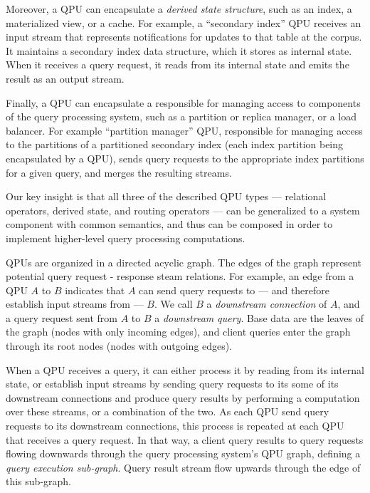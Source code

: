 Moreover, a QPU can encapsulate a \textit{derived state structure}, such as an index, a materialized view, or a cache.
For example, a ``secondary index'' QPU receives an input stream that represents notifications for updates to that table
at the corpus.
It maintains a secondary index data structure, which it stores as internal state.
When it receives a query request, it reads from its internal state and emits the result as an output stream.

Finally, a QPU can encapsulate a responsible for managing access to components of the query processing system, such as
a partition or replica manager, or a load balancer.
For example ``partition manager'' QPU, responsible for managing access to the partitions of a partitioned secondary index
(each index partition being encapsulated by a QPU), sends query requests to the appropriate index partitions for a given
query, and merges the resulting streams.

Our key insight is that all three of the described QPU types --- relational operators, derived state, and routing operators ---
can be generalized to a system component with common semantics, and thus can be composed in order to implement higher-level
query processing computations.

\medskip
\noindent
QPUs are organized in a directed acyclic graph.
The edges of the graph represent potential query request - response steam relations.
For example, an edge from a QPU $A$ to $B$ indicates that $A$ can send query requests to
--- and therefore establish input streams from --- $B$.
We call $B$ a \textit{downstream connection} of $A$, and a query request sent from $A$ to $B$ a \textit{downstream query}.
Base data are the leaves of the graph (nodes with only incoming edges),
and client queries enter the graph through its root nodes (nodes with outgoing edges).

When a QPU receives a query, it can either process it by reading from its internal state, or establish input streams
by sending query requests to its some of its downstream connections and produce query results by performing a
computation over these streams,
or a combination of the two.
As each QPU send query requests to its downstream connections,
this process is repeated at each QPU that receives a query request.
In that way, a client query results to query requests flowing downwards through the query processing system's QPU graph,
defining a \textit{query execution sub-graph}.
Query result stream flow upwards through the edge of this sub-graph.


